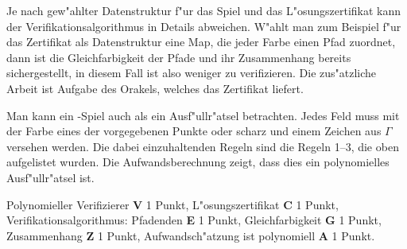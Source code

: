 \begin{loesung}
Je nach gew"ahlter Datenstruktur f"ur das Spiel und das L"osungszertifikat
kann der Verifikationsalgorithmus in Details abweichen.
W"ahlt man zum Beispiel f"ur das Zertifikat als Datenstruktur eine Map,
die jeder Farbe einen Pfad zuordnet, dann ist die Gleichfarbigkeit der
Pfade und ihr Zusammenhang bereits sichergestellt, in diesem Fall
ist also weniger zu verifizieren.
Die zus"atzliche Arbeit ist Aufgabe des Orakels, welches das Zertifikat
liefert.

Man kann ein \spielname-Spiel auch als ein Ausf"ullr"atsel betrachten.
Jedes Feld muss mit der Farbe eines der vorgegebenen Punkte oder scharz 
und einem Zeichen aus $\Gamma$ versehen werden.
Die dabei einzuhaltenden Regeln sind die Regeln 1--3, die oben aufgelistet
wurden.
Die Aufwandsberechnung zeigt, dass dies ein polynomielles Ausf"ullr"atsel ist.
\end{loesung}

\begin{bewertung}
Polynomieller Verifizierer {\bf V} 1 Punkt,
L"osungszertifikat {\bf C} 1 Punkt,
Verifikationsalgorithmus: Pfadenden {\bf E} 1 Punkt,
Gleichfarbigkeit {\bf G} 1 Punkt,
Zusammenhang {\bf Z} 1 Punkt,
Aufwandsch"atzung ist polynomiell {\bf A} 1 Punkt.
\end{bewertung}


